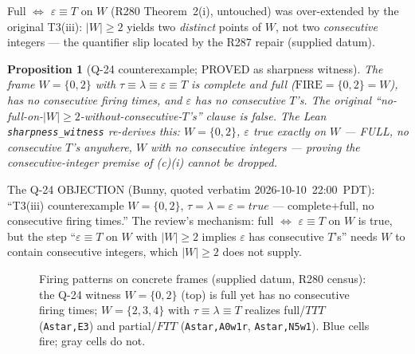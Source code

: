 \documentclass[11pt,a4paper]{article}
\newtheorem{proposition}{Proposition}
\theoremstyle{definition}
\begin{document}
Full $\iff$ $\varepsilon\equiv T$ on $W$ (R280 Theorem~2(i), untouched)
was over-extended by the original T3(iii): $|W|\ge2$ yields two
\emph{distinct} points of $W$, not two \emph{consecutive} integers ---
the quantifier slip located by the R287 repair (supplied datum).

\begin{proposition}[Q-24 counterexample; PROVED as sharpness witness]
  \label{prop:q24}
  The frame $W=\{0,2\}$ with $\tau\equiv\lambda\equiv\varepsilon\equiv
  T$ is complete and full ($\mathrm{FIRE}=\{0,2\}=W$), has no
  consecutive firing times, and $\varepsilon$ has no consecutive $T$'s.
  The original ``no-full-on-$|W|\ge2$-without-consecutive-$T$'s'' clause
  is false. The Lean \texttt{sharpness\_witness} re-derives this:
  $W=\{0,2\}$, $\varepsilon$ true exactly on $W$ --- FULL, no
  consecutive $T$'s anywhere, $W$ with no consecutive integers ---
  proving the consecutive-integer premise of (c)(i) cannot be dropped.
\end{proposition}

The Q-24 OBJECTION (Bunny, quoted verbatim 2026-10-10~22:00~PDT):
``T3(iii) counterexample $W=\{0,2\}$, $\tau=\lambda=\varepsilon=true$
--- complete+full, no consecutive firing times.'' The review's
mechanism: full $\iff$ $\varepsilon\equiv T$ on $W$ is true, but the
step ``$\varepsilon\equiv T$ on $W$ with $|W|\ge2$ implies
$\varepsilon$ has consecutive $T$'s'' needs $W$ to contain consecutive
integers, which $|W|\ge2$ does not supply.

\begin{figure}[t]
  \centering
  \caption{Firing patterns on concrete frames (supplied datum, R280
    census): the Q-24 witness $W=\{0,2\}$ (top) is full yet has no
    consecutive firing times; $W=\{2,3,4\}$ with $\tau\equiv\lambda\equiv
    T$ realizes full/$TTT$ (\texttt{Astar,E3}) and partial/$FTT$
    (\texttt{Astar,A0w1r}, \texttt{Astar,N5w1}). Blue cells fire; gray
    cells do not.}
  \label{fig:frames}
\end{figure}
\end{document}
